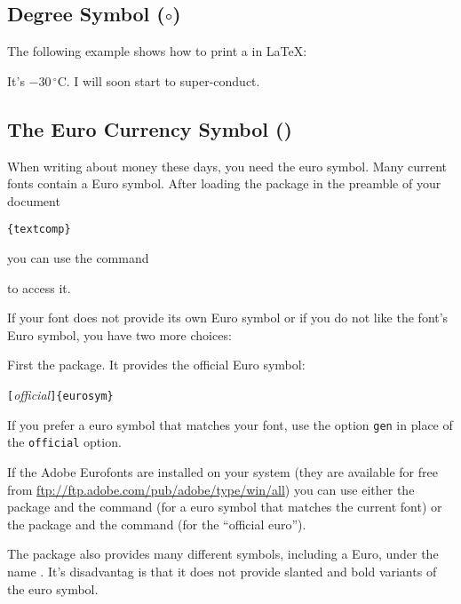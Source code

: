 \subsection{Degree Symbol \texorpdfstring{($\circ$)}{}}

The following example shows how to print a  in \LaTeX{}:

\begin{example}
It's $-30\,^{\circ}\mathrm{C}$.
I will soon start to
super-conduct.
\end{example}

\subsection{The Euro Currency Symbol \texorpdfstring{(\EUR)}{}}

When writing about money these days, you need the euro symbol. Many current
fonts contain a Euro symbol. After loading the  package in the preamble of your document
\begin{lscommand}
\verb|{textcomp}| 
\end{lscommand}
you can use the command
\begin{lscommand}
\end{lscommand}
to access it.

If your font does not provide its own Euro symbol or if you do not like the
font's Euro symbol, you have two more choices:

First the  package. It provides the official Euro symbol:
\begin{lscommand}
\verb|[|\emph{official}\verb|]{eurosym}| 
\end{lscommand}
If you prefer a euro symbol that matches your font, use the option
\texttt{gen} in place of the \texttt{official} option.

If the Adobe Eurofonts are installed on your system (they are available for
free from \url{ftp://ftp.adobe.com/pub/adobe/type/win/all}) you can use
either the package  and the command  (for a euro symbol
that matches the current font) or the package
 and the command  (for the ``official euro'').

The  package also provides many different symbols, including a
Euro, under the name . It's disadvantag is that it does not provide
slanted and bold variants of the euro symbol.


